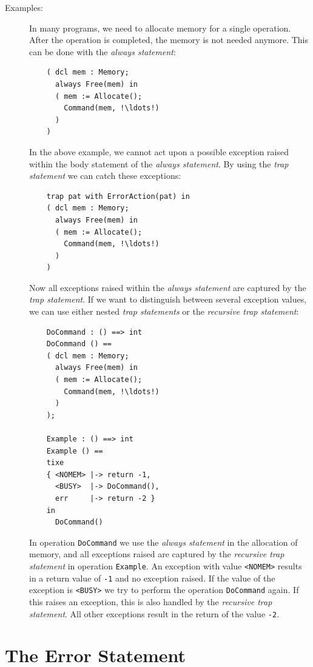 \documentclass{overturerepchap}
\begin{document}
\begin{description}
\item[Examples:] In many programs, we need to allocate memory for a
  single operation. After the operation is completed, the memory is not
  needed anymore. This can be done with the {\it always statement}:
  \begin{lstlisting}
    ( dcl mem : Memory;
      always Free(mem) in
      ( mem := Allocate();
        Command(mem, !\ldots!)
      )
    )
  \end{lstlisting}
  In the above example, we cannot act upon a possible exception raised
  within the body statement of the {\it always statement}. By using the
  {\it trap statement\/} we can catch these exceptions:
  \begin{lstlisting}
    trap pat with ErrorAction(pat) in
    ( dcl mem : Memory;
      always Free(mem) in
      ( mem := Allocate();
        Command(mem, !\ldots!)
      )
    )
  \end{lstlisting}
  Now all exceptions raised within the {\it always statement\/} are
  captured by the {\it trap statement}. If we want to distinguish between
  several exception values, we can use either nested {\it trap
    statements\/} or the {\it recursive trap statement}:
  \begin{lstlisting}
    DoCommand : () ==> int
    DoCommand () ==
    ( dcl mem : Memory;
      always Free(mem) in
      ( mem := Allocate();
        Command(mem, !\ldots!)
      )
    );

    Example : () ==> int
    Example () ==
    tixe
    { <NOMEM> |-> return -1,
      <BUSY>  |-> DoCommand(),
      err     |-> return -2 }
    in
      DoCommand()
  \end{lstlisting}
  In operation {\tt DoCommand} we use the {\it always statement\/} in the
  allocation of memory, and all exceptions raised are captured by the {\it
    recursive trap statement\/} in operation {\tt Example}. An exception
  with value {\tt <NOMEM>} results in a return value of {\tt -1} and no
  exception raised. If the value of the exception is {\tt <BUSY>} we try to
  perform the operation {\tt DoCommand} again. If this raises an exception,
  this is also handled by the {\it recursive trap statement}. All other
  exceptions result in the return of the value {\tt -2}.  
\end{description}

\section{The Error Statement}
\end{document}
